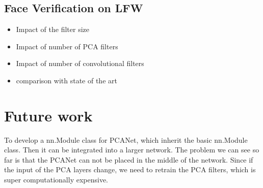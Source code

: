 \documentclass{article} %
\begin{document}
\subsection{Face Verification on LFW}
\begin{itemize}
	\item Impact of the filter size
	\item Impact of number of PCA filters
	\item Impact of number of convolutional filters
	\item comparison with state of the art
\end{itemize}




%
%
%

\section{Future work}
To develop a nn.Module class for PCANet, which inherit the basic nn.Module class. Then it can be integrated into a larger network. The problem we can see so far is that the PCANet can not be placed in the middle of the network. Since if the input of the PCA layers change, we need to retrain the PCA filters, which is super computationally expensive.

{}

\end{document}
